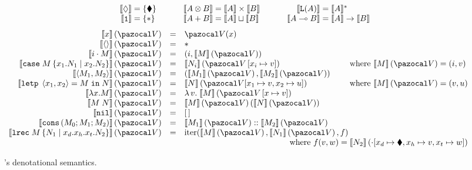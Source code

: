 \begin{figure}[t!]
\vspace{-1em}
\[
\begin{array}{@{\hspace{3.3em}}r@{\;=\;}l@{\hspace{3.3em}}r@{\;=\;}l@{\hspace{3.3em}}r@{\;=\;}l}
\tpsem{\tpdiam} & \{ \blacklozenge \} &
\tpsem{\tptens{A}{B}} & \tpsem{A} \times \tpsem{B} &
\tpsem{\tplist{A}} & \tpsem{A}^* \\
%
\tpsem{\tpunit} & \{ \ast \} &
\tpsem{\tpsum{A}{B}} & \tpsem{A} \sqcup \tpsem{B} &
\tpsem{\tparr{A}{B}} & \tpsem{A} \to \tpsem{B}
\end{array}
\]
\[
\begin{array}{rcll}
\tmsem{x}{\env} &=& \env(x) \\
\tmsem{\tmnull}{\env} &=& \ast \\
\tmsem{\tminj{i}{M}}{\env} &=& (i, \tmsem{M}{\env}) \\
\tmsem{\tmcase{M}{x_1}{N_1}{x_2}{N_2}}{\env} &=& \tmsem{N_i}{\envcons{\env}{x_i}{v}} 
&\!\!\!\!\! \text{where }  \tmsem{M}{\env} = (i, v) \\
\tmsem{\tmpair{M_1}{M_2}}{\env} &=& (\tmsem{M_1}{\env}, \tmsem{M_2}{\env}) \\
\tmsem{\tmletp{M}{x_1}{x_2}{N}}{\env} &=& \tmsem{N}{\env[x_1 \mapsto v, x_2 \mapsto u]}
&\!\!\!\!\! \text{where }  \tmsem{M}{\env} = (v, u) \\
\tmsem{\tmlam{x}{M}}{\env} &=& \lambda \, v . \; \tmsem{M}{\envcons{\env}{x}{v}} \; \\
\tmsem{\tmapp{M}{N}}{\env} &=& \tmsem{M}{\env} \left( \tmsem{N}{\env} \right) \\
\tmsem{\tmnil}{\env} &=& \emptylist \\
\tmsem{\tmcons{M_0}{M_1}{M_2}}{\env} &=& \tmsem{M_1}{\env} :: \tmsem{M_2}{\env} \\
  \tmsem{\tmrec{M}{N_1}{x_d}{x_h}{x_t}{N_2}}{\env} &=& \text{iter}(\tmsem{M}{\env}, \tmsem{N_1}{\env}, f)\\
&& \multicolumn{2}{r}{\text{where } f(v, w) = \tmsem{N_2}{\envnil[x_d \mapsto \blacklozenge, x_h \mapsto v, x_t \mapsto w]}}
\end{array}
\]

\caption{\lfpl's denotational semantics.}
\label{fig:sem-tp-tm}
\end{figure}
